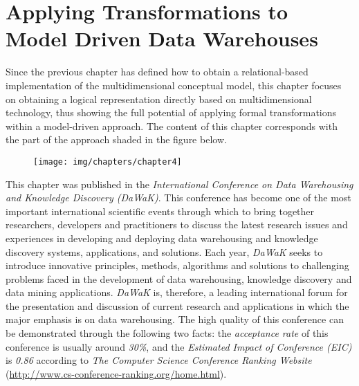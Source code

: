 %
%
%



\chapter{Applying Transformations to Model Driven Data Warehouses}
\label{c4} %

Since the previous chapter has defined how to obtain a
relational-based implementation of the multidimensional conceptual
model, this chapter focuses on obtaining a logical representation
directly based on multidimensional technology, thus showing the full
potential of applying formal transformations within a model-driven
approach. The content of this chapter corresponds with the part of
the approach shaded in the figure below.

\begin{figure}[h!]
  \begin{center}
    \texttt{[image: img/chapters/chapter4]}
  \end{center}
\end{figure}


This chapter was published in the \emph{International Conference on
Data Warehousing and Knowledge Discovery (DaWaK)}. This conference
has become one of the most important international scientific events
through which to bring together researchers, developers and
practitioners to discuss the latest research issues and experiences
in developing and deploying data warehousing and knowledge discovery
systems, applications, and solutions. Each year, \emph{DaWaK} seeks
to introduce innovative principles, methods, algorithms and
solutions to challenging problems faced in the development of data
warehousing, knowledge discovery and data mining applications.
\emph{DaWaK} is, therefore, a leading international forum for the
presentation and discussion of current research and applications in
which the major emphasis is on data warehousing. The high quality of
this conference can be demonstrated through the following two facts:
the \emph{acceptance rate} of this conference is usually around
\emph{30\%}, and the \emph{Estimated Impact of Conference (EIC)} is
\emph{0.86} according to \emph{The Computer Science Conference
Ranking Website}
(\url{http://www.cs-conference-ranking.org/home.html}).



%
